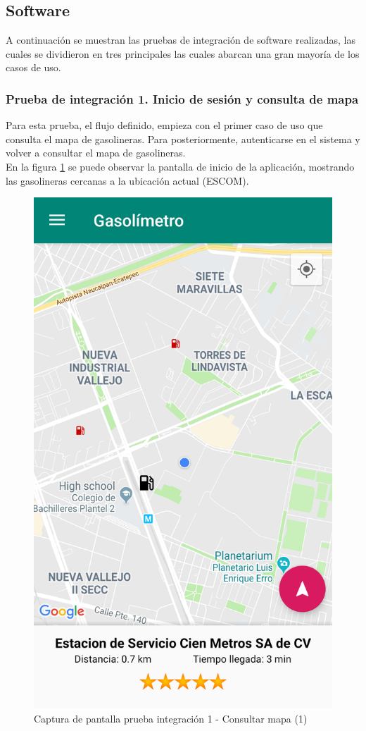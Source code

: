 \subsection{Software}
A continuación se muestran las pruebas de integración de software realizadas, las cuales se dividieron en tres principales las cuales abarcan una gran mayoría de los casos de uso.
\subsubsection{Prueba de integración 1. Inicio de sesión y consulta de mapa}
Para esta prueba, el flujo definido, empieza con el primer caso de uso que consulta el mapa de gasolineras. Para posteriormente, autenticarse en el sistema y volver a consultar el mapa de gasolineras.\\
En la figura \ref{fig:int1} se puede observar la pantalla de inicio de la aplicación, mostrando las gasolineras cercanas a la ubicación actual (ESCOM).

\begin{figure}[H]
	\centering
	\includegraphics[scale=.2]{Capitulo6/integracion/software/images/1}
	\caption{Captura de pantalla prueba integración 1 - Consultar mapa (1)}
	\label{fig:int1}
\end{figure}

